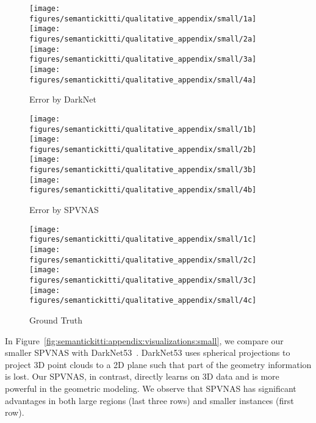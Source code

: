 \documentclass[runningheads]{llncs}
\newcommand{\fig}[1]{Figure~\ref{#1}}
\def\modelshort{SPVNAS\xspace}
\begin{document}
\begin{figure*}[ht!]
    \centering
    \begin{subfigure}[t]{0.32\linewidth}
        \centering
        \texttt{[image: figures/semantickitti/qualitative\_appendix/small/1a]}
        \texttt{[image: figures/semantickitti/qualitative\_appendix/small/2a]}
        \texttt{[image: figures/semantickitti/qualitative\_appendix/small/3a]}
        \texttt{[image: figures/semantickitti/qualitative\_appendix/small/4a]}
        \caption{Error by DarkNet}
        \label{fig:semantickitti:appendix:mink:small}
    \end{subfigure}
    \begin{subfigure}[t]{0.32\linewidth}
        \centering
        \texttt{[image: figures/semantickitti/qualitative\_appendix/small/1b]}
        \texttt{[image: figures/semantickitti/qualitative\_appendix/small/2b]}
        \texttt{[image: figures/semantickitti/qualitative\_appendix/small/3b]}
        \texttt{[image: figures/semantickitti/qualitative\_appendix/small/4b]}
        \caption{Error by \modelshort}
        \label{fig:semantickitti:appendix:pv:small}
    \end{subfigure}
    \begin{subfigure}[t]{0.32\linewidth}
        \centering
        \texttt{[image: figures/semantickitti/qualitative\_appendix/small/1c]}
        \texttt{[image: figures/semantickitti/qualitative\_appendix/small/2c]}
        \texttt{[image: figures/semantickitti/qualitative\_appendix/small/3c]}
        \texttt{[image: figures/semantickitti/qualitative\_appendix/small/4c]}
        \caption{Ground Truth}
        \label{fig:semantickitti:appendix:gt:small}
    \end{subfigure}
    \caption{Qualitative comparisons between DarkNet53~\cite{behley2019semantickitti} and \modelshort. }
    \vspace{-8pt}
    \label{fig:semantickitti:appendix:visualizations:small}
\end{figure*} 
In \fig{fig:semantickitti:appendix:visualizations:small}, we compare our smaller \modelshort with DarkNet53~\cite{behley2019semantickitti}. DarkNet53 uses spherical projections to project 3D point clouds to a 2D plane such that part of the geometry information is lost. Our \modelshort, in contrast, directly learns on 3D data and is more powerful in the geometric modeling. We observe that \modelshort has significant advantages in both large regions (last three rows) and smaller instances (first row).
\end{document}
